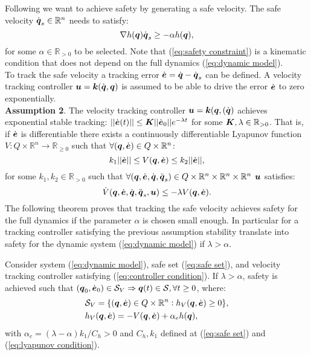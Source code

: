 Following \cite{mf_cbf} we want to achieve safety by generating a safe velocity. The safe velocity $\dot{{\boldsymbol{q}}}_s \in \mathbb{R}^n$ needs to satisfy:
\begin{equation} \label{eq:safety constraint}
    \nabla h({\boldsymbol{q}})\dot{{\boldsymbol{q}}}_s \geq -\alpha h({\boldsymbol{q}}),
\end{equation}
for some $\alpha \in \mathbb{R}_{>0}$ to be selected. Note that (\ref{eq:safety constraint}) is a kinematic condition that does not depend on the full dynamics (\ref{eq:dynamic model}).\\
To track the safe velocity a tracking error $\dot{\boldsymbol{e}} = \dot{{\boldsymbol{q}}}-\dot{{\boldsymbol{q}}}_s$ can be defined. A velocity tracking controller $\boldsymbol{u} = \boldsymbol{k}(\dot{{\boldsymbol{q}}},{\boldsymbol{q}})$ is assumed to be able to drive the error $\dot{\boldsymbol{e}}$ to zero exponentially.\\
\textbf{Assumption 2}. The velocity tracking controller $\boldsymbol{u} = \boldsymbol{k}({\boldsymbol{q}},(\dot{{\boldsymbol{q}}})$ achieves exponential stable tracking: $||\dot{\boldsymbol{e}}(t)||\leq \boldsymbol{K} ||\dot{\boldsymbol{e}}_0|| e^{-\lambda t}$ for some $\boldsymbol{K},\lambda \in \mathbb{R}_{>0}$. That is, if $\dot{\boldsymbol{e}}$ is differentiable there exists a continuously differentiable Lyapunov function $V: Q \times \mathbb{R}^n \rightarrow \mathbb{R}_{\geq 0}$ such that $\forall({\boldsymbol{q}},\dot{\boldsymbol{e}})\in Q \times \mathbb{R}^n$:
\begin{equation} \label{eq:lyapunov condition}
    k_1 || \dot{\boldsymbol{e}}|| \leq V({\boldsymbol{q}}, \dot{\boldsymbol{e}}) \leq k_2 || \dot{\boldsymbol{e}}||,
\end{equation}
for some $k_1,k_2\in \mathbb{R}_{>0}$ such that $\forall({\boldsymbol{q}},\dot{\boldsymbol{e}},\dot{{\boldsymbol{q}}},\ddot{{\boldsymbol{q}}}_s)\in Q \times \mathbb{R}^n \times \mathbb{R}^n \times \mathbb{R}^n$ $\boldsymbol{u}$ satisfies:
\begin{equation} \label{eq:controller condition}
    \dot{V}({\boldsymbol{q}},\dot{\boldsymbol{e}},\dot{{\boldsymbol{q}}},\ddot{{\boldsymbol{q}}}_s,\boldsymbol{u}) \leq -\lambda V({\boldsymbol{q}},\dot{\boldsymbol{e}}).
\end{equation}
The following theorem proves that tracking the safe velocity achieves safety for the full dynamics if the parameter $\alpha$ is chosen small enough. In particular for a tracking controller satisfying the previous assumption stability translate into safety for the dynamic system (\ref{eq:dynamic model}) if $\lambda > \alpha$. 
\begin{theorem}\label{th:alpha limit}
    Consider system (\ref{eq:dynamic model}), safe set (\ref{eq:safe set}), and velocity tracking controller satisfying (\ref{eq:controller condition}). If $\lambda > \alpha$, safety is achieved such that $({\boldsymbol{q}}_0,\dot{\boldsymbol{e}}_0)\in \mathcal{S}_V \Rightarrow {\boldsymbol{q}}(t) \in \mathcal{S}, \forall t\geq 0$, where:
    \begin{align}
        &\mathcal{S}_V = \{ ({\boldsymbol{q}},\dot{\boldsymbol{e}})\in Q \times \mathbb{R}^n: h_V({\boldsymbol{q}},\dot{\boldsymbol{e}})\geq 0 \},\\
        &h_V({\boldsymbol{q}},\dot{\boldsymbol{e}}) = -V({\boldsymbol{q}},\dot{\boldsymbol{e}})+ \alpha_e h({\boldsymbol{q}}), \label{eq:h_V}
    \end{align}
    with $\alpha_e = (\lambda - \alpha)k_1/C_h > 0$ and $C_h,k_1$ defined at (\ref{eq:safe set}) and (\ref{eq:lyapunov condition}).
\end{theorem}
